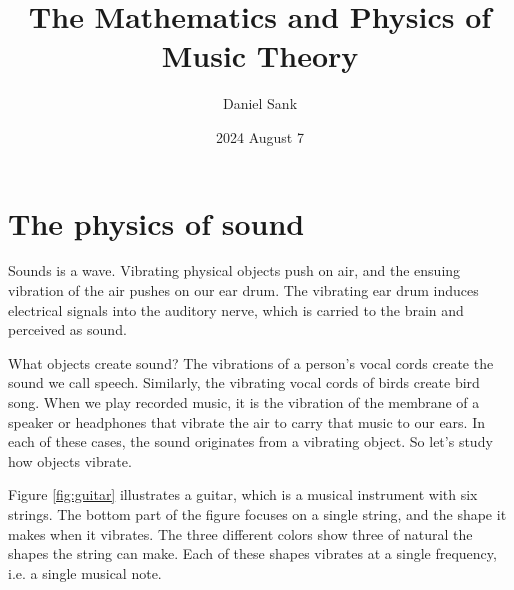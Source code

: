 \documentclass{article}
\author{Daniel Sank}
\date{2024 August 7}
\title{The Mathematics and Physics of Music Theory}
\begin{document}
\maketitle

\section{The physics of sound}

Sounds is a wave.
Vibrating physical objects push on air, and the ensuing vibration of the air pushes on our ear drum.
The vibrating ear drum induces electrical signals into the auditory nerve, which is carried to the brain and perceived as sound.

What objects create sound?
The vibrations of a person's vocal cords create the sound we call speech.
Similarly, the vibrating vocal cords of birds create bird song.
When we play recorded music, it is the vibration of the membrane of a speaker or headphones that vibrate the air to carry that music to our ears.
In each of these cases, the sound originates from a vibrating object.
So let's study how objects vibrate.

Figure \ref{fig:guitar} illustrates a guitar, which is a musical instrument with six strings.
The bottom part of the figure focuses on a single string, and the shape it makes when it vibrates.
The three different colors show three of natural the shapes the string can make.
Each of these shapes vibrates at a single frequency, i.e. a single musical note.
\end{document}
